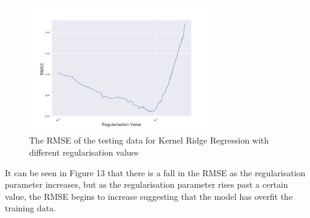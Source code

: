 \documentclass[a4paper,11pt,twoside]{article}
\begin{document}
      \begin{figure}[!htb]
        \centerline{\includegraphics[width=0.7\textwidth]
        {../errvals.png}}
        \caption{\label{fig:my-label} The RMSE of the testing data for Kernel Ridge Regression with different regularisation values}
      \end{figure}


It can be seen in Figure 13 that there is a fall in the RMSE as the regularisation parameter increases, but as the regularisation parameter rises past a certain value, the RMSE begins to increase suggesting that the model has overfit the training data.
\end{document}
